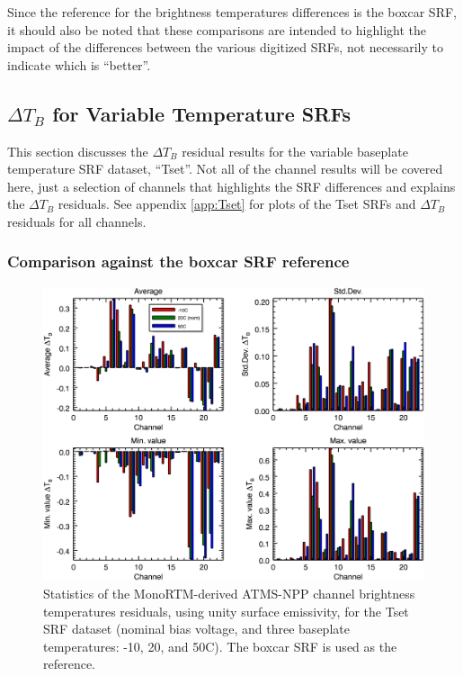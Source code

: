 Since the reference for the brightness temperatures differences is the boxcar SRF, it should also be noted that these comparisons are intended to highlight the impact of the differences between the various digitized SRFs, not necessarily to indicate which is ``better''.


\subsection{$\Delta T_B$ for Variable Temperature SRFs}
\label{sec:rt.Tset}
This section discusses the $\Delta T_B$ residual results for the variable baseplate temperature SRF dataset, ``Tset''. Not all of the channel results will be covered here, just a selection of channels that highlights the SRF differences and explains the $\Delta T_B$ residuals. See appendix \ref{app:Tset} for plots of the Tset SRFs and $\Delta T_B$ residuals for all channels.

\subsubsection{Comparison against the boxcar SRF reference}
\begin{figure}[H]
  \centering
    \includegraphics[bb=0 0 416 333,clip,scale=0.9]{graphics/dtb/Tset/e1.0_r0.0/stats_ref-boxcar.png} 
  \caption{Statistics of the MonoRTM-derived ATMS-NPP channel brightness temperatures residuals, using unity surface emissivity, for the Tset SRF dataset (nominal bias voltage, and three baseplate temperatures: -10, 20, and 50\textdegree{}C). The boxcar SRF is used as the reference.}
  \label{fig:Tset_e1.0_r0.0_stats_ref-boxcar}
\end{figure}

